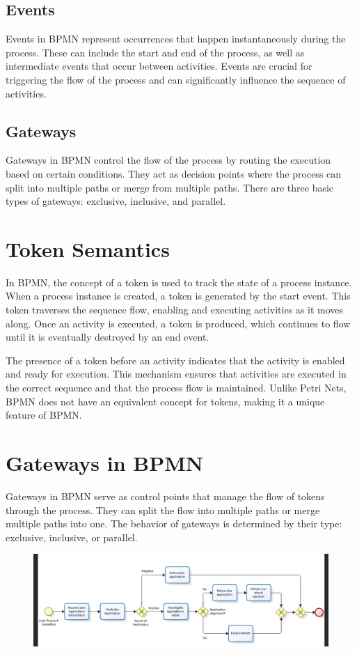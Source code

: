 \subsection{Events}

Events in BPMN represent occurrences that happen instantaneously during the process. These can include the start and end of the process, as well as intermediate events that occur between activities. Events are crucial for triggering the flow of the process and can significantly influence the sequence of activities.

\subsection{Gateways}

Gateways in BPMN control the flow of the process by routing the execution based on certain conditions. They act as decision points where the process can split into multiple paths or merge from multiple paths. There are three basic types of gateways: exclusive, inclusive, and parallel.

\section{Token Semantics}

In BPMN, the concept of a token is used to track the state of a process instance. When a process instance is created, a token is generated by the start event. This token traverses the sequence flow, enabling and executing activities as it moves along. Once an activity is executed, a token is produced, which continues to flow until it is eventually destroyed by an end event.

The presence of a token before an activity indicates that the activity is enabled and ready for execution. This mechanism ensures that activities are executed in the correct sequence and that the process flow is maintained. Unlike Petri Nets, BPMN does not have an equivalent concept for tokens, making it a unique feature of BPMN.

\section{Gateways in BPMN}

Gateways in BPMN serve as control points that manage the flow of tokens through the process. They can split the flow into multiple paths or merge multiple paths into one. The behavior of gateways is determined by their type: exclusive, inclusive, or parallel.
\begin{figure}[h!]
    \centering
    \includegraphics[width=1\linewidth]{capitolo 9/6.png}
\end{figure}

